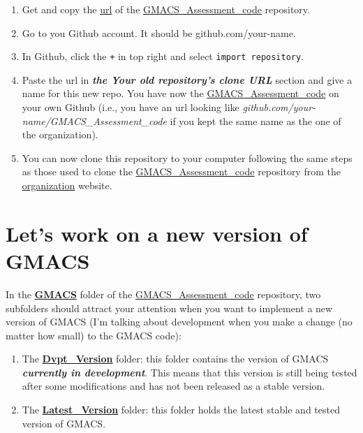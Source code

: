 \documentclass[
]{article}
\providecommand{\tightlist}{%
  \setlength{\itemsep}{0pt}\setlength{\parskip}{0pt}}
\begin{document}
\begin{enumerate}
\def\labelenumi{\arabic{enumi}.}
\tightlist
\item
  Get and copy the
  \href{https://github.com/GMACS-project/GMACS_Assessment_code}{url} of
  the
  \href{https://github.com/GMACS-project/GMACS_Assessment_code}{GMACS\_Assessment\_code}
  repository.
\item
  Go to you Github account. It should be github.com/your-name.
\item
  In Github, click the \texttt{+} in top right and select
  \texttt{import\ repository}.
\item
  Paste the url in \textbf{\emph{the Your old repository's clone URL}}
  section and give a name for this new repo. You have now the
  \href{https://github.com/GMACS-project/GMACS_Assessment_code}{GMACS\_Assessment\_code}
  on your own Github (i.e., you have an url looking like
  \emph{github.com/your-name/GMACS\_Assessment\_code} if you kept the
  same name as the one of the organization).
\item
  You can now clone this repository to your computer following the same
  steps as those used to clone the
  \href{https://github.com/GMACS-project/GMACS_Assessment_code}{GMACS\_Assessment\_code}
  repository from the
  \href{https://github.com/GMACS-project}{organization} website.
\end{enumerate}

\hypertarget{lets-work-on-a-new-version-of-gmacs}{%
\section{Let's work on a new version of
GMACS}\label{lets-work-on-a-new-version-of-gmacs}}

In the
\textbf{\href{https://github.com/GMACS-project/GMACS_Assessment_code/tree/main/GMACS}{GMACS}}
folder of the
\href{https://github.com/GMACS-project/GMACS_Assessment_code}{GMACS\_Assessment\_code}
repository, two subfolders should attract your attention when you want
to implement a new version of GMACS (I'm talking about development when
you make a change (no matter how small) to the GMACS code):

\begin{enumerate}
\def\labelenumi{\arabic{enumi}.}
\tightlist
\item
  The
  \textbf{\href{https://github.com/GMACS-project/GMACS_Assessment_code/tree/main/GMACS/Dvpt_Version}{Dvpt\_Version}}
  folder: this folder contains the version of GMACS
  \textbf{\emph{currently in development}}. This means that this version
  is still being tested after some modifications and has not been
  released as a stable version.
\item
  The
  \textbf{\href{https://github.com/GMACS-project/GMACS_Assessment_code/tree/main/GMACS/Latest_Version}{Latest\_Version}}
  folder: this folder holds the latest stable and tested version of
  GMACS.
\end{enumerate}
\end{document}
